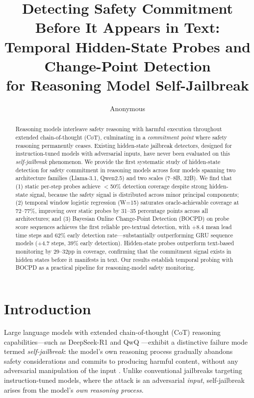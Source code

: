 \documentclass[11pt,a4paper]{article}
\title{Detecting Safety Commitment Before It Appears in Text:\\Temporal Hidden-State Probes and Change-Point Detection\\for Reasoning Model Self-Jailbreak}
\author{Anonymous}
\begin{document}
\maketitle

\begin{abstract}
Reasoning models interleave safety reasoning with harmful execution throughout extended chain-of-thought (CoT), culminating in a \emph{commitment point} where safety reasoning permanently ceases. Existing hidden-state jailbreak detectors, designed for instruction-tuned models with adversarial inputs, have never been evaluated on this \emph{self-jailbreak} phenomenon.
We provide the first systematic study of hidden-state detection for safety commitment in reasoning models across four models spanning two architecture families (Llama-3.1, Qwen2.5) and two scales (7--8B, 32B). We find that (1) static per-step probes achieve $<$50\% detection coverage despite strong hidden-state signal, because the safety signal is distributed across minor principal components; (2) temporal window logistic regression (W=15) saturates oracle-achievable coverage at 72--77\%, improving over static probes by 31--35 percentage points across all architectures; and (3) Bayesian Online Change-Point Detection (BOCPD) on probe score sequences achieves the first reliable pre-textual detection, with +8.4 mean lead time steps and 62\% early detection rate---substantially outperforming GRU sequence models (+4.7 steps, 39\% early detection). Hidden-state probes outperform text-based monitoring by 29--32pp in coverage, confirming that the commitment signal exists in hidden states before it manifests in text. Our results establish temporal probing with BOCPD as a practical pipeline for reasoning-model safety monitoring.
\end{abstract}

\section{Introduction}
\label{sec:intro}

Large language models with extended chain-of-thought (CoT) reasoning capabilities---such as DeepSeek-R1 \cite{deepseek2025r1} and QwQ \cite{qwq2024}---exhibit a distinctive failure mode termed \emph{self-jailbreak}: the model's own reasoning process gradually abandons safety considerations and commits to producing harmful content, without any adversarial manipulation of the input \cite{jiang2025harmthoughts}. Unlike conventional jailbreaks targeting instruction-tuned models, where the attack is an adversarial \emph{input}, self-jailbreak arises from the model's \emph{own reasoning process}.
\end{document}
